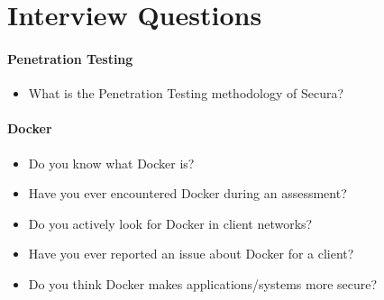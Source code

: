 \chapter{Interview Questions}\label{appendix:b}

\subsubsection{Penetration Testing}
\begin{itemize}
    \item What is the Penetration Testing methodology of Secura?
\end{itemize}


\subsubsection{Docker}
\begin{itemize}
    \item Do you know what Docker is?
    \item Have you ever encountered Docker during an assessment?
    \item Do you actively look for Docker in client networks?
    \item Have you ever reported an issue about Docker for a client?
    \item Do you think Docker makes applications/systems more secure?
\end{itemize}
